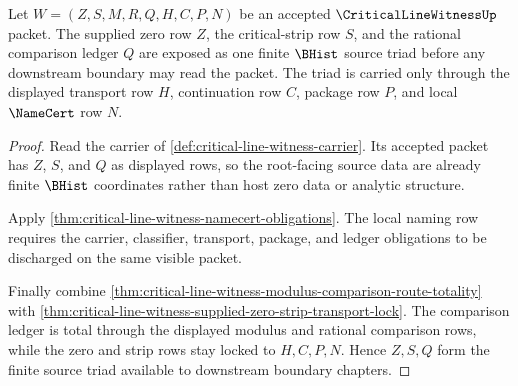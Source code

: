 \begin{theorem}
\label{thm:critical-line-witness-root-source-triad}
Let $W=(Z,S,M,R,Q,H,C,P,N)$ be an accepted $\CriticalLineWitnessUp$ packet. The supplied zero row $Z$, the critical-strip row $S$, and the rational comparison ledger $Q$ are exposed as one finite $\BHist$ source triad before any downstream boundary may read the packet. The triad is carried only through the displayed transport row $H$, continuation row $C$, package row $P$, and local $\NameCert$ row $N$.
\end{theorem}
\begin{proof}
Read the carrier of \autoref{def:critical-line-witness-carrier}. Its accepted packet has $Z$, $S$, and $Q$ as displayed rows, so the root-facing source data are already finite $\BHist$ coordinates rather than host zero data or analytic structure.

Apply \autoref{thm:critical-line-witness-namecert-obligations}. The local naming row requires the carrier, classifier, transport, package, and ledger obligations to be discharged on the same visible packet.

Finally combine \autoref{thm:critical-line-witness-modulus-comparison-route-totality} with \autoref{thm:critical-line-witness-supplied-zero-strip-transport-lock}. The comparison ledger is total through the displayed modulus and rational comparison rows, while the zero and strip rows stay locked to $H,C,P,N$. Hence $Z,S,Q$ form the finite source triad available to downstream boundary chapters.
\end{proof}

